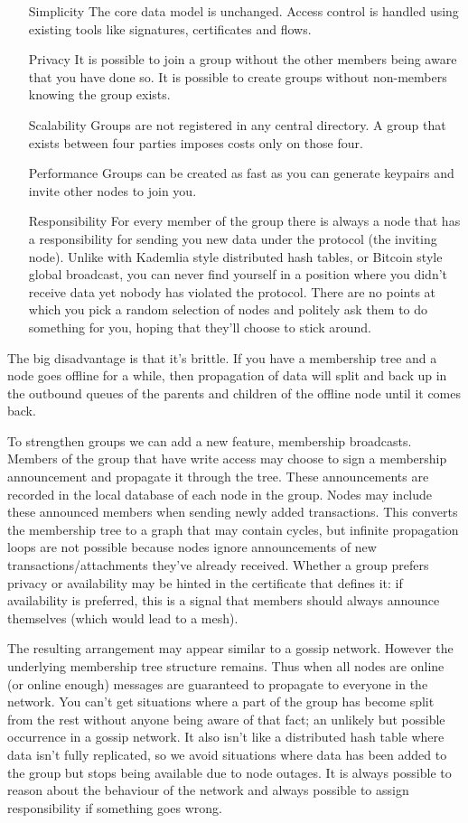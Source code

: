 \documentclass{article}
\begin{document}
\begin{itemize}
\item [Simplicity] The core data model is unchanged. Access control is handled using existing tools like signatures, certificates and flows.
\item [Privacy] It is possible to join a group without the other members being aware that you have done so. It is possible to create groups without non-members knowing the group exists.
\item [Scalability] Groups are not registered in any central directory. A group that exists between four parties imposes costs only on those four.
\item [Performance] Groups can be created as fast as you can generate keypairs and invite other nodes to join you.
\item [Responsibility] For every member of the group there is always a node that has a responsibility for sending you
new data under the protocol (the inviting node). Unlike with Kademlia style distributed hash tables, or Bitcoin style
global broadcast, you can never find yourself in a position where you didn't receive data yet nobody has violated the
protocol. There are no points at which you pick a random selection of nodes and politely ask them to do something for
you, hoping that they'll choose to stick around.
\end{itemize}

The big disadvantage is that it's brittle. If you have a membership tree and a node goes offline for a while, then
propagation of data will split and back up in the outbound queues of the parents and children of the offline node
until it comes back.

To strengthen groups we can add a new feature, membership broadcasts. Members of the group that have write access
may choose to sign a membership announcement and propagate it through the tree. These announcements are recorded in
the local database of each node in the group. Nodes may include these announced members when sending newly added
transactions. This converts the membership tree to a graph that may contain cycles, but infinite propagation loops
are not possible because nodes ignore announcements of new transactions/attachments they've already received.
Whether a group prefers privacy or availability may be hinted in the certificate that defines it: if availability
is preferred, this is a signal that members should always announce themselves (which would lead to a mesh).

The resulting arrangement may appear similar to a gossip network. However the underlying membership tree structure
remains. Thus when all nodes are online (or online enough) messages are guaranteed to propagate to everyone in the
network. You can't get situations where a part of the group has become split from the rest without anyone being
aware of that fact; an unlikely but possible occurrence in a gossip network. It also isn't like a distributed hash
table where data isn't fully replicated, so we avoid situations where data has been added to the group but stops
being available due to node outages. It is always possible to reason about the behaviour of the network and always
possible to assign responsibility if something goes wrong.
\end{document}
